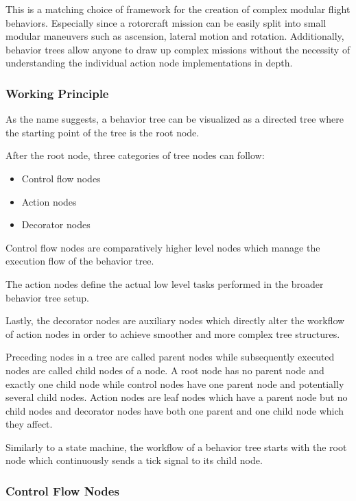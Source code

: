 This is a matching choice of framework for the creation of complex modular flight behaviors. Especially since a rotorcraft mission can be easily split into small modular maneuvers such as ascension, lateral motion and rotation. Additionally, behavior trees allow anyone to draw up complex missions without the necessity of understanding the individual action node implementations in depth.

\subsubsection{Working Principle}
As the name suggests, a behavior tree can be visualized as a directed tree where the starting point of the tree is the root node. 

After the root node, three categories of tree nodes can follow:

\begin{itemize}
    \item Control flow nodes
    \item Action nodes
    \item Decorator nodes
    \end{itemize}
    
    Control flow nodes are comparatively higher level nodes which manage the execution flow of the behavior tree.
    
    The action nodes define the actual low level tasks performed in the broader behavior tree setup. 
    
    Lastly, the decorator nodes are auxiliary nodes which directly alter the workflow of action nodes in order to achieve smoother and more complex tree structures.
    
    Preceding nodes in a tree are called parent nodes while subsequently executed nodes are called child nodes of a node. A root node has no parent node and exactly one child node while control nodes have one parent node and potentially several child nodes. Action nodes are leaf nodes which have a parent node but no child nodes and decorator nodes have both one parent and one child node which they affect.

    Similarly to a state machine, the workflow of a behavior tree starts with the root node which continuously sends a tick signal to its child node. 

\subsubsection{Control Flow Nodes}

